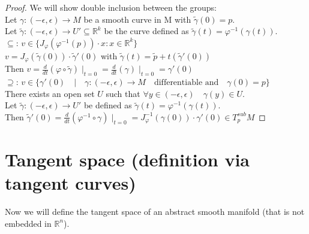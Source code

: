 \documentclass[11pt]{book} %
\begin{document}
\begin{proof}{We will show double inclusion between the groups:} \\

    Let \( \gamma : (-\epsilon, \epsilon) \to M \) be a smooth curve in M with \( \tilde{\gamma}(0) = p \). \\
    Let \( \tilde{\gamma} : (-\epsilon, \epsilon) \to U' \subseteq \mathbb{R}^k \) be the curve defined as \( \tilde{\gamma}(t) = \varphi^{-1}(\gamma(t)) \). \\
    
    \( \subseteq \): \( v \in \{ J_{\varphi}(\varphi^{-1}(p)) \cdot x : x \in \mathbb{R}^k \} \) \\
    \( v = J_{\varphi}(\tilde{\gamma}(0)) \cdot \tilde{\gamma}'(0) \)  with \( \tilde{\gamma}(t) = \tilde{p} + t( \tilde{\gamma}'(0)) \) \\ 
    Then \( v = \frac{d}{dt}(\varphi \circ \tilde{\gamma}) \mid _{t=0} = \frac{d}{dt}(\gamma) \mid _{t=0} = \gamma'(0) \) \\

    \medbreak
    \( \supseteq \): \( v \in \{ \gamma'(0) \quad | \quad \gamma : (-\epsilon, \epsilon) \to M \quad \text{differentiable and} \quad \gamma(0) = p \} \) \\
    There exists an open set \( U \) such that \( \forall y \in (-\epsilon, \epsilon)\quad \gamma(y) \in U \). \\
    Let \( \tilde{\gamma} : (-\epsilon, \epsilon) \to U' \) be defined as \( \tilde{\gamma}(t) = \varphi^{-1}(\gamma(t)) \). \\
    Then \( \tilde{\gamma}'(0) = \frac{d}{dt}(\varphi^{-1} \circ \gamma) \mid _{t=0} = J_{\varphi}^{-1}(\gamma(0)) \cdot \gamma'(0) \in T_p^{sub}M \)  
\end{proof}




\section{Tangent space (definition via tangent curves)}

Now we will define the tangent space of an abstract smooth manifold (that is not embedded in \( \mathbb{R}^n \)).
\end{document}
